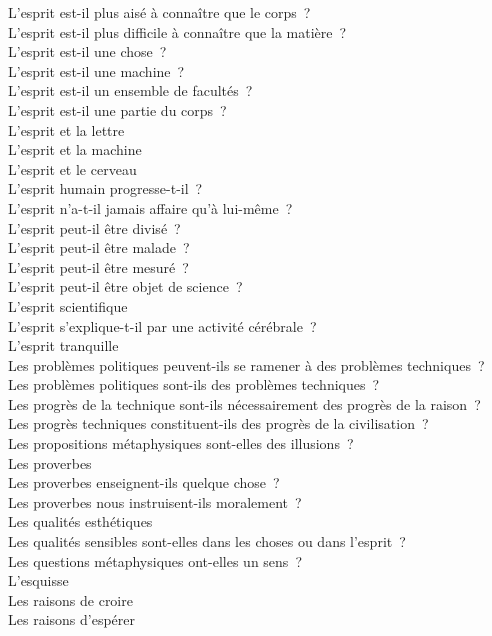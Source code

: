 \documentclass[a4paper,12pt]{article}
\begin{document}
L'esprit est-il plus aisé à connaître que le corps ? \\
L'esprit est-il plus difficile à connaître que la matière ? \\
L'esprit est-il une chose ? \\
L'esprit est-il une machine ? \\
L'esprit est-il un ensemble de facultés ? \\
L'esprit est-il une partie du corps ? \\
L'esprit et la lettre \\
L'esprit et la machine \\
L'esprit et le cerveau \\
L'esprit humain progresse-t-il ? \\
L'esprit n'a-t-il jamais affaire qu'à lui-même ? \\
L'esprit peut-il être divisé ? \\
L'esprit peut-il être malade ? \\
L'esprit peut-il être mesuré ? \\
L'esprit peut-il être objet de science ? \\
L'esprit scientifique \\
L'esprit s'explique-t-il par une activité cérébrale ? \\
L'esprit tranquille \\
Les problèmes politiques peuvent-ils se ramener à des problèmes techniques ? \\
Les problèmes politiques sont-ils des problèmes techniques ? \\
Les progrès de la technique sont-ils nécessairement des progrès de la raison ? \\
Les progrès techniques constituent-ils des progrès de la civilisation ? \\
Les propositions métaphysiques sont-elles des illusions ? \\
Les proverbes \\
Les proverbes enseignent-ils quelque chose ? \\
Les proverbes nous instruisent-ils moralement ? \\
Les qualités esthétiques \\
Les qualités sensibles sont-elles dans les choses ou dans l'esprit ? \\
Les questions métaphysiques ont-elles un sens ? \\
L'esquisse \\
Les raisons de croire \\
Les raisons d'espérer \\
\end{document}
